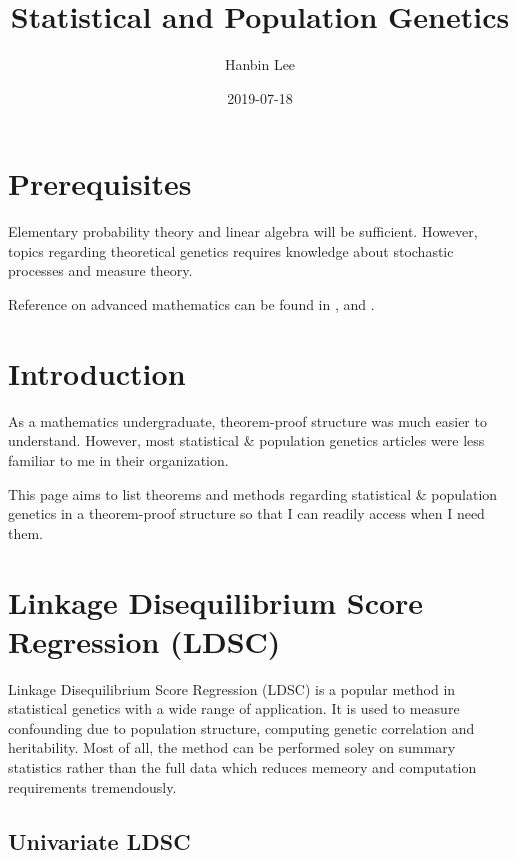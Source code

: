 \documentclass[]{book}
\title{Statistical and Population Genetics}
\author{Hanbin Lee}
\date{2019-07-18}
\theoremstyle{definition}
\theoremstyle{definition}
\theoremstyle{definition}
\theoremstyle{remark}
\begin{document}
\maketitle

{
\setcounter{tocdepth}{1}
\tableofcontents
}
\newcommand{\E}{\mathbb{E}}
\newcommand{\V}{\mathrm{Var}}

\chapter{Prerequisites}\label{prerequisites}

Elementary probability theory and linear algebra will be sufficient.
However, topics regarding theoretical genetics requires knowledge about
stochastic processes and measure theory.

Reference on advanced mathematics can be found in
\citet{walterrudin1986}, \citet{rickdurrett2019} and
\citet{rickdurrett2008}.

\chapter{Introduction}\label{intro}

As a mathematics undergraduate, theorem-proof structure was much easier
to understand. However, most statistical \& population genetics articles
were less familiar to me in their organization.

This page aims to list theorems and methods regarding statistical \&
population genetics in a theorem-proof structure so that I can readily
access when I need them.

\chapter{Linkage Disequilibrium Score Regression
(LDSC)}\label{linkage-disequilibrium-score-regression-ldsc}

Linkage Disequilibrium Score Regression (LDSC) is a popular method in
statistical genetics with a wide range of application. It is used to
measure confounding due to population structure, computing genetic
correlation and heritability. Most of all, the method can be performed
soley on summary statistics rather than the full data which reduces
memeory and computation requirements tremendously.

\section{Univariate LDSC}\label{univariate-ldsc}
\end{document}
